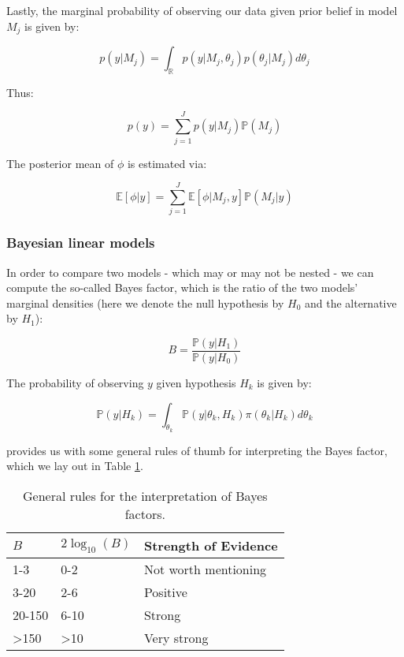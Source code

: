 \documentclass{report}
\begin{document}
Lastly, the marginal probability of observing our data given prior belief in model $M_j$ is given by:

\begin{equation}\label{eq:ols-bayes-bma-data-prob}
    p(y | M_j) = \int_{\mathbb{R}} p(y | M_j, \theta_j) p(\theta_j | M_j) d\theta_j
\end{equation}

Thus:

\begin{equation}\label{eq:ols-bayes-bma-y-prob}
    p(y) = \sum_{j=1}^J p(y | M_j) \mathbb{P}(M_j)
\end{equation}

The posterior mean of $\phi$ is estimated via:

\begin{equation}\label{eq:ols-bayes-bma-phi-posterior-mean}
    \mathbb{E}[\phi | y] = \sum_{j=1}^J \mathbb{E}[\phi | M_j, y] \mathbb{P}(M_j | y)
\end{equation}

\subsubsection{Bayesian linear models}

In order to compare two models - which may or may not be nested - we can compute the so-called Bayes factor, which is the ratio of the two models' marginal densities (here we denote the null hypothesis by $H_0$ and the alternative by $H_1$):

\begin{equation}\label{eq:ols-bayes-bf-1}
    B = \frac{\mathbb{P}(y | H_1)}{\mathbb{P}(y | H_0)}
\end{equation}

The probability of observing $y$ given hypothesis $H_k$ is given by:

\begin{equation}\label{eq:ols-bayes-bf-2}
    \mathbb{P}(y | H_k) = \int_{\theta_k} \mathbb{P}(y | \theta_k, H_k) \pi(\theta_k | H_k) d\theta_k
\end{equation}

\cite{kass_bayes_1995} provides us with some general rules of thumb for interpreting the Bayes factor, which we lay out in Table \ref{table:bayes-factor}. 

\begin{table}[h!]
\centering
\begin{tabular}{||l l l||} 
 \hline
 $B$ & $2\log_{10}(B)$ & \textbf{Strength of Evidence} \\ [0.5ex] 
  \hline\hline
  1-3 & 0-2 & Not worth mentioning \\
  \hline
  3-20 & 2-6 & Positive \\
  \hline 
  20-150 & 6-10 & Strong \\
  \hline
  >150 & >10 & Very strong \\
  \hline
\end{tabular}
\caption{General rules for the interpretation of Bayes factors.}
\label{table:bayes-factor}
\end{table}
\end{document}
